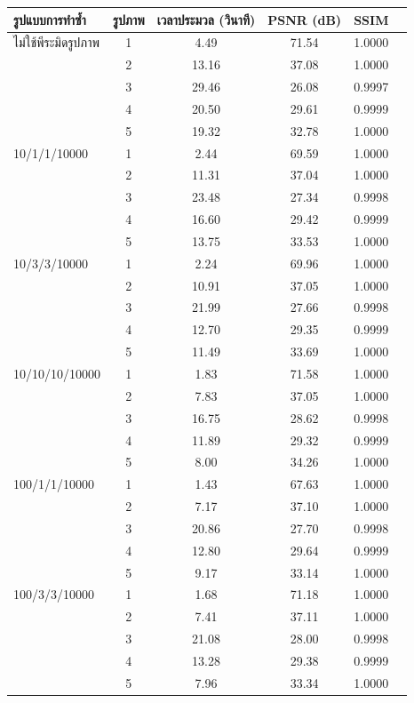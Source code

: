 \documentclass[hidelinks, a4paper,12pt]{article}
\numberwithin{equation}{section}							%
\numberwithin{equation}{section}
\begin{document}
{	\begin{table}[H]
		\footnotesize
		\centering
		\begin{tabular}[ht]{|l|c|c|c|c|c|}
			\hline
			รูปแบบการทำซ้ำ  & รูปภาพ &เวลาประมวล  (วินาที) & PSNR (dB) & SSIM \\
			\hline
			ไม่ใช้พีระมิดรูปภาพ & 1 & 4.49  & 71.54 & 1.0000 \\ 
			& 2 & 13.16 & 37.08 & 1.0000 \\
			& 3 & 29.46 & 26.08 & 0.9997 \\
			& 4 & 20.50 & 29.61 & 0.9999 \\
			& 5 & 19.32 & 32.78 & 1.0000 \\
			\hline
			10/1/1/10000 & 1 & 2.44 & 69.59& 1.0000 \\
			& 2 & 11.31 &37.04 & 1.0000 \\
			& 3 & 23.48 & 27.34 & 0.9998 \\
			& 4 & 16.60 & 29.42 & 0.9999 \\
			& 5 & 13.75 & 33.53 & 1.0000 \\
			\hline
			10/3/3/10000  & 1 & 2.24 & 69.96 & 1.0000\\
			& 2 & 10.91 & 37.05 & 1.0000 \\
			& 3 & 21.99 & 27.66 & 0.9998 \\
			& 4 & 12.70 & 29.35 & 0.9999 \\
			& 5 & 11.49 & 33.69 & 1.0000\\
			\hline
			10/10/10/10000  & 1 & 1.83 & 71.58 & 1.0000 \\
			& 2 & 7.83 & 37.05 & 1.0000 \\
			& 3 & 16.75 & 28.62 & 0.9998 \\
			& 4 & 11.89 & 29.32 & 0.9999 \\
			& 5 & 8.00 & 34.26 & 1.0000 \\
			\hline
			100/1/1/10000  & 1 & 1.43 & 67.63 & 1.0000\\
			& 2 & 7.17 & 37.10 & 1.0000 \\
			& 3 & 20.86 & 27.70 & 0.9998 \\
			& 4 & 12.80 & 29.64 & 0.9999\\
			& 5 & 9.17 & 33.14 & 1.0000 \\
			\hline
			100/3/3/10000  & 1 & 1.68 & 71.18 & 1.0000 \\
			& 2 & 7.41 & 37.11 & 1.0000\\
			& 3 & 21.08 & 28.00 & 0.9998 \\
			& 4 & 13.28 & 29.38 & 0.9999 \\
			& 5 & 7.96 & 33.34 & 1.0000\\

\end{tabular}
\end{table}}
\end{document}
